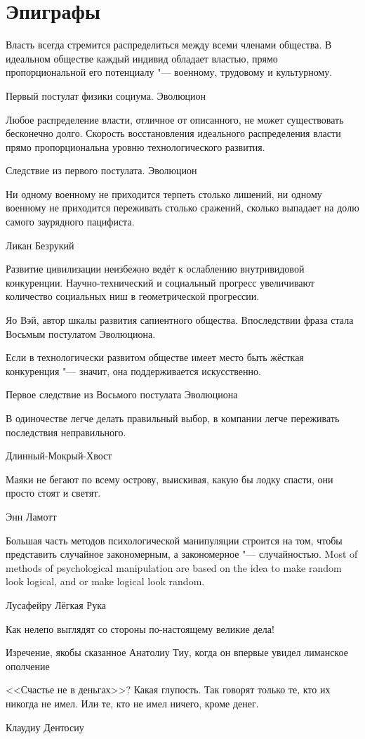 \chapter{Эпиграфы}

\epigraph
{Власть всегда стремится распределиться между всеми членами общества.
В идеальном обществе каждый индивид обладает властью, прямо пропорциональной его потенциалу "--- военному, трудовому и культурному.}
{Первый постулат физики социума. Эволюцион}

\epigraph
{Любое распределение власти, отличное от описанного, не может существовать бесконечно долго.
Скорость восстановления идеального распределения власти прямо пропорциональна уровню технологического развития.}
{Следствие из первого постулата. Эволюцион}

\epigraph
{Ни одному военному не приходится терпеть столько лишений, ни одному военному не приходится переживать столько сражений, сколько выпадает на долю самого заурядного пацифиста.}
{Ликан Безрукий}

\epigraph
{Развитие цивилизации неизбежно ведёт к ослаблению внутривидовой конкуренции.
Научно-технический и социальный прогресс увеличивают количество социальных ниш в геометрической прогрессии.}
{Яо Вэй, автор шкалы развития сапиентного общества.
Впоследствии фраза стала Восьмым постулатом Эволюциона.}

\epigraph{Если в технологически развитом обществе имеет место быть жёсткая конкуренция "--- значит, она поддерживается искусственно.}
{Первое следствие из Восьмого постулата Эволюциона}

\epigraph
{В одиночестве легче делать правильный выбор, в компании легче переживать последствия неправильного.}
{Длинный-Мокрый-Хвост}

\epigraph
{Маяки не бегают по всему острову, выискивая, какую бы лодку спасти, они просто стоят и светят.}
{Энн Ламотт}

\epigraph{
{Большая часть методов психологической манипуляции строится на том, чтобы представить случайное закономерным, а закономерное "--- случайностью.}
{Most of methods of psychological manipulation are based on the idea to make random look logical, and or make logical look random.}
}{Лусафейру Лёгкая Рука}

\epigraph
{Как нелепо выглядят со стороны по-настоящему великие дела!}
{Изречение, якобы сказанное Анатолиу Тиу, когда он впервые увидел лиманское ополчение}

\epigraph
{<<Счастье не в деньгах>>?
Какая глупость.
Так говорят только те, кто их никогда не имел.
Или те, кто не имел ничего, кроме денег.}
{Клаудиу Дентосиу}


